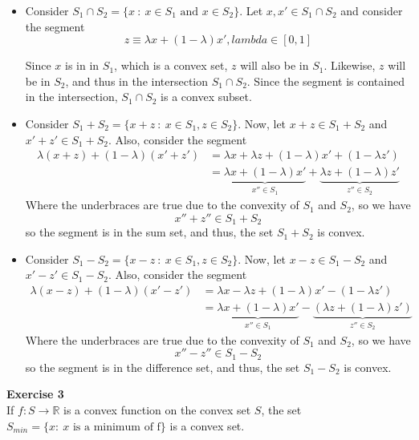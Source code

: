 \documentclass[11pt,table]{article}
\newenvironment{problem}[2][Exercise]
    { \begin{mdframed}[backgroundcolor=gray!20] \textbf{#1 #2} \\}
    {  \end{mdframed}}
\begin{document}
\begin{itemize}
	\item Consider \(S_{1} \cap S_{2}  =  \{x \ : \ x \in S_{1} \text{ and } x \in S_{2}\}\). Let \(x,x' \in S_1 \cap S_2\) and consider the segment
	\[
		z \equiv \lambda x + (1-\lambda)x', lambda \in [0,1]
	\]
	
	Since \(x\) is in in \(S_1\), which is a convex set, \(z\) will also be in \(S_1\). Likewise, \(z\) will be in \(S_2\), and thus in the intersection \(S_{1} \cap S_{2}\). Since the segment is contained in the intersection, \(S_{1} \cap S_{2}\) is a convex subset.
	
	\item Consider \(S_{1} + S_{2}  =  \{x + z \ : \ x \in S_{1}, z \in S_{2}\}\). Now, let \(x+z \in S_1 + S_2\) and \(x'+z' \in S_1+S_2\). Also, consider the segment
	\begin{align*}
		\lambda(x+z) + (1-\lambda)(x'+z') & = \lambda x + \lambda z + (1-\lambda)x' + (1-\lambda z')\\
		& = \underbrace{\lambda x +(1-\lambda)x'}_{x'' \in S_1} + \underbrace{\lambda z + (1-\lambda)z'}_{z'' \in S_2}  
	\end{align*}
	Where the underbraces are true due to the convexity of \(S_1\) and \(S_2\), so we have
	\[
	x'' + z'' \in S_1 + S_2   
	\]
	so the segment is in the sum set, and thus, the set \(S_1 + S_2\) is convex.
	
	\item Consider \(S_{1} - S_{2}  =  \{x - z \ : \ x \in S_{1}, z \in S_{2}\}\). Now, let \(x-z \in S_1 - S_2\) and \(x'-z' \in S_1-S_2\). Also, consider the segment
	\begin{align*}
	\lambda(x-z) + (1-\lambda)(x'-z') & = \lambda x - \lambda z + (1-\lambda)x' - (1-\lambda z')\\
	& = \underbrace{\lambda x +(1-\lambda)x'}_{x'' \in S_1} - \underbrace{\left( \lambda z + (1-\lambda)z'\right)}_{z'' \in S_2}  
	\end{align*}
	Where the underbraces are true due to the convexity of \(S_1\) and \(S_2\), so we have
	\[
	x'' - z'' \in S_1 - S_2   
	\]
	so the segment is in the difference set, and thus, the set \(S_1 - S_2\) is convex.
\end{itemize}


\begin{problem}{3}
  If \( f: S \to \mathbb{R} \) is a convex function on the convex set \( S \), the set \( S_{min} = \{x : \ x \text{ is a minimum of f} \} \) is a convex set.
\end{problem}
\end{document}
